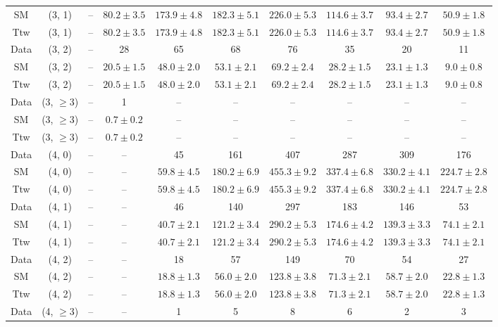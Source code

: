 \begin{table}[h!]
{\begin{tabular}{cccccccccc}
	SM & (3, 1) & -- & $80.2\pm 3.5$ & $173.9\pm 4.8$ & $182.3\pm 5.1$ & $226.0\pm 5.3$ & $114.6\pm 3.7$ & $93.4\pm 2.7$ & $50.9\pm 1.8$ \\[0.5ex] 
	Ttw & (3, 1) & -- & $80.2\pm 3.5$ & $173.9\pm 4.8$ & $182.3\pm 5.1$ & $226.0\pm 5.3$ & $114.6\pm 3.7$ & $93.4\pm 2.7$ & $50.9\pm 1.8$ \\[0.5ex] 
	Data & (3, 2) & -- & 28 & 65 & 68 & 76 & 35 & 20 & 11 \\[0.5ex] 
	SM & (3, 2) & -- & $20.5\pm 1.5$ & $48.0\pm 2.0$ & $53.1\pm 2.1$ & $69.2\pm 2.4$ & $28.2\pm 1.5$ & $23.1\pm 1.3$ & $9.0\pm 0.8$ \\[0.5ex] 
	Ttw & (3, 2) & -- & $20.5\pm 1.5$ & $48.0\pm 2.0$ & $53.1\pm 2.1$ & $69.2\pm 2.4$ & $28.2\pm 1.5$ & $23.1\pm 1.3$ & $9.0\pm 0.8$ \\[0.5ex] 
	Data & (3, $\ge3$) & -- & 1 & -- & -- & -- & -- & -- & -- \\[0.5ex] 
	SM & (3, $\ge3$) & -- & $0.7\pm 0.2$ & -- & -- & -- & -- & -- & -- \\[0.5ex] 
	Ttw & (3, $\ge3$) & -- & $0.7\pm 0.2$ & -- & -- & -- & -- & -- & -- \\[0.5ex] 
	Data & (4, 0) & -- & -- & 45 & 161 & 407 & 287 & 309 & 176 \\[0.5ex] 
	SM & (4, 0) & -- & -- & $59.8\pm 4.5$ & $180.2\pm 6.9$ & $455.3\pm 9.2$ & $337.4\pm 6.8$ & $330.2\pm 4.1$ & $224.7\pm 2.8$ \\[0.5ex] 
	Ttw & (4, 0) & -- & -- & $59.8\pm 4.5$ & $180.2\pm 6.9$ & $455.3\pm 9.2$ & $337.4\pm 6.8$ & $330.2\pm 4.1$ & $224.7\pm 2.8$ \\[0.5ex] 
	Data & (4, 1) & -- & -- & 46 & 140 & 297 & 183 & 146 & 53 \\[0.5ex] 
	SM & (4, 1) & -- & -- & $40.7\pm 2.1$ & $121.2\pm 3.4$ & $290.2\pm 5.3$ & $174.6\pm 4.2$ & $139.3\pm 3.3$ & $74.1\pm 2.1$ \\[0.5ex] 
	Ttw & (4, 1) & -- & -- & $40.7\pm 2.1$ & $121.2\pm 3.4$ & $290.2\pm 5.3$ & $174.6\pm 4.2$ & $139.3\pm 3.3$ & $74.1\pm 2.1$ \\[0.5ex] 
	Data & (4, 2) & -- & -- & 18 & 57 & 149 & 70 & 54 & 27 \\[0.5ex] 
	SM & (4, 2) & -- & -- & $18.8\pm 1.3$ & $56.0\pm 2.0$ & $123.8\pm 3.8$ & $71.3\pm 2.1$ & $58.7\pm 2.0$ & $22.8\pm 1.3$ \\[0.5ex] 
	Ttw & (4, 2) & -- & -- & $18.8\pm 1.3$ & $56.0\pm 2.0$ & $123.8\pm 3.8$ & $71.3\pm 2.1$ & $58.7\pm 2.0$ & $22.8\pm 1.3$ \\[0.5ex] 
	Data & (4, $\ge3$) & -- & -- & 1 & 5 & 8 & 6 & 2 & 3 \\[0.5ex] 

\end{tabular}}
\end{table}
